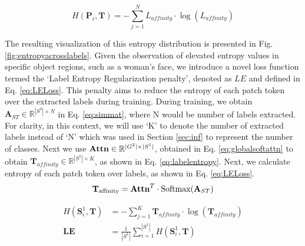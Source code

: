 \begin{equation}
\label{eq:lentropy}
H(\textbf{P}_i, \textbf{T}) = -\sum_{j=1}^{N} \textbf{$L_{affinity}$} \cdot \log(\textbf{$L_{affinity}$})
\end{equation}

The resulting visualization of this entropy distribution is presented in Fig. \ref{fig:entropyacrosslabels}. Given the observation of elevated entropy values in specific object regions, such as a woman's face, we introduce a novel loss function termed the `Label Entropy Regularization penalty', denoted as \(LE\) and defined in Eq. \ref{eq:LELoss}. This penalty aims to reduce the entropy of each patch token over the extracted labels during training.
During training, we obtain  $\textbf{A}_{ST} \in \mathbb{R}^{|S^3| \times N}$ in Eq. \ref{eq:simmat}, where N would be number of labels extracted. For clarity, in this context, we will use `K' to denote the number of extracted labels instead of `N' which was used in Section \ref{sec:inf} to represent the number of classes. Next we use $\text{\textbf{Attn}} \in \mathbb{R}^{|G^2| \times |S^1|}$, obtained in Eq. \ref{eq:globalsoftattn} to obtain $\textbf{T}_{affinity} \in \mathbb{R}^{|S^1| \times K}$, as shown in Eq. \ref{eq:labelentropy}. Next, we calculate entropy of each patch token over labels, as shown in Eq. \ref{eq:LELoss}. 
\begin{equation}
\label{eq:labelentropy}
\mathbf{T}_{\text{affinity}} = \text{\textbf{Attn}}^T \cdot \text{Softmax}({\textbf{A}}_{ST})
\end{equation}

\begin{align}
H(\textbf{S}^1_i, \textbf{T}) &= -\sum_{j=1}^{K} \textbf{$\textbf{T}_{affinity}$} \cdot \log(\textbf{$\textbf{T}_{affinity}$}) \\
\label{eq:LELoss}
\textbf{LE} &= \frac{1}{|S^1|} \sum_{i=1}^{|S^1|} H(\textbf{S}^1_i, \textbf{T})
\end{align}


